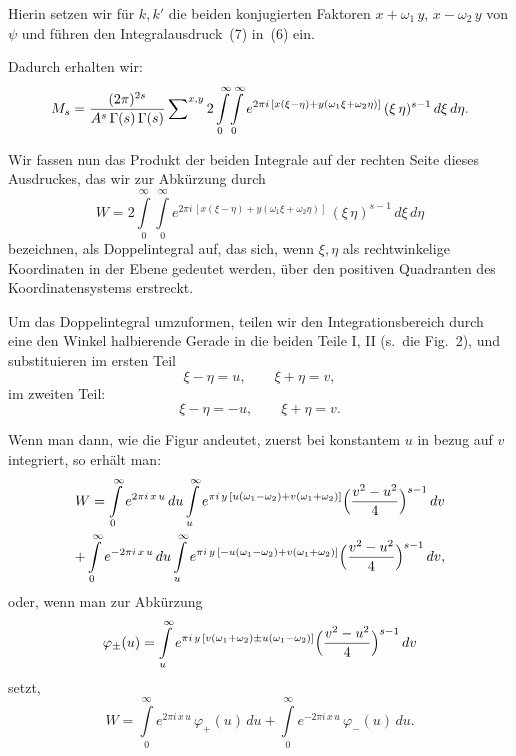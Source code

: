 \documentclass[12pt,a4paper]{article}
\theoremstyle{definition}
\begin{document}
Hierin setzen wir für $k, k'$ die beiden konjugierten Faktoren 
$x + \omega_{1}\,y$, $x - \omega_{2}\,y$ von $\psi$ und führen den 
Integralausdruck~(7) in~(6) ein.

Dadurch erhalten wir:
\begin{equation}
M_{s} = \frac{(2\pi)^{2s}}{A^{s}\,\Gamma(s)\,\Gamma(s)}
\sideset{}{^{x,y}}\sum 2
\int\limits_{0}^{\infty}\!\int\limits_{0}^{\infty}
e^{2\pi i\,[x(\xi-\eta) + y(\omega_{1}\xi + \omega_{2}\eta)]}
\,(\xi\,\eta)^{s-1}\,d\xi\,d\eta.
\end{equation}

Wir fassen nun das Produkt der beiden Integrale auf der rechten Seite dieses 
Ausdruckes, das wir zur Abkürzung durch
\begin{equation}
W = 2\int\limits_{0}^{\infty}\!\int\limits_{0}^{\infty}
e^{2\pi i\,[x(\xi-\eta) + y(\omega_{1}\xi + \omega_{2}\eta)]}
\,(\xi\,\eta)^{s-1}\,d\xi\,d\eta
\end{equation}
bezeichnen, als Doppelintegral auf, das sich, wenn $\xi, \eta$ als 
rechtwinkelige Koordinaten in der Ebene gedeutet werden, über den positiven 
Quadranten des Koordinatensystems erstreckt.

Um das Doppelintegral umzuformen, teilen wir den Integrationsbereich durch 
eine den Winkel halbierende Gerade in die beiden Teile I, II (s.~die 
Fig.~2), und substituieren im ersten Teil
\[
\xi - \eta = u,\qquad \xi + \eta = v,
\]
im zweiten Teil:
\[
\xi - \eta = -u,\qquad \xi + \eta = v.
\]

Wenn man dann, wie die Figur andeutet, zuerst bei konstantem $u$ in bezug 
auf $v$ integriert, so erhält man:
\begin{multline*}
W = \int\limits_{0}^{\infty} e^{2\pi i\,x\,u}\,du
\int\limits_{u}^{\infty} e^{\pi i\,y\,[u(\omega_{1}-\omega_{2}) + v(\omega_{1}+\omega_{2})]}
\Bigl(\frac{v^{2}-u^{2}}{4}\Bigr)^{s-1}\,dv\\
+ \int\limits_{0}^{\infty} e^{-2\pi i\,x\,u}\,du
\int\limits_{u}^{\infty} e^{\pi i\,y\,[-u(\omega_{1}-\omega_{2}) + v(\omega_{1}+\omega_{2})]}
\Bigl(\frac{v^{2}-u^{2}}{4}\Bigr)^{s-1}\,dv,
\end{multline*}
oder, wenn man zur Abkürzung
\begin{equation}
\varphi_{\pm}(u) = \int\limits_{u}^{\infty}
e^{\pi i\,y\,[v(\omega_{1}+\omega_{2}) \pm u(\omega_{1}-\omega_{2})]}
\Bigl(\frac{v^{2}-u^{2}}{4}\Bigr)^{s-1}\,dv
\end{equation}
setzt,
\begin{equation}
W = \int\limits_{0}^{\infty} e^{2\pi i\,x\,u}\,\varphi_{+}(u)\,du
+ \int\limits_{0}^{\infty} e^{-2\pi i\,x\,u}\,\varphi_{-}(u)\,du.
\end{equation}
\end{document}
